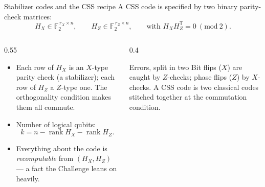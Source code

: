 \documentclass[11pt,aspectratio=169]{beamer}
\newcommand{\GF}{\mathbb{F}_2}
\newcommand{\rank}{\operatorname{rank}}
\begin{document}
\begin{frame}{Stabilizer codes and the CSS recipe}
  A CSS code is specified by two binary parity-check matrices:
  \[
    H_X \in \GF^{\,r_X \times n}, \qquad
    H_Z \in \GF^{\,r_Z \times n}, \qquad
    \text{with } H_X H_Z^{\mathsf T} = 0 \ (\mathrm{mod}\ 2).
  \]
  \begin{columns}[T]
    \begin{column}{0.55\textwidth}
      \begin{itemize}\setlength{\itemsep}{6pt}
        \item Each row of $H_X$ is an $X$-type parity check (a stabilizer);
              each row of $H_Z$ a $Z$-type one. The orthogonality condition makes
              them all commute.
        \item Number of logical qubits:
              \[ k = n - \rank H_X - \rank H_Z. \]
        \item Everything about the code is \emph{recomputable} from
              $(H_X, H_Z)$ --- a fact the Challenge leans on heavily.
      \end{itemize}
    \end{column}
    \begin{column}{0.4\textwidth}
      \begin{block}{Errors, split in two}
        Bit flips ($X$) are caught by $Z$-checks; phase flips ($Z$) by
        $X$-checks. A CSS code is two classical codes stitched together at the
        commutation condition.
      \end{block}
    \end{column}
  \end{columns}
\end{frame}
\end{document}
